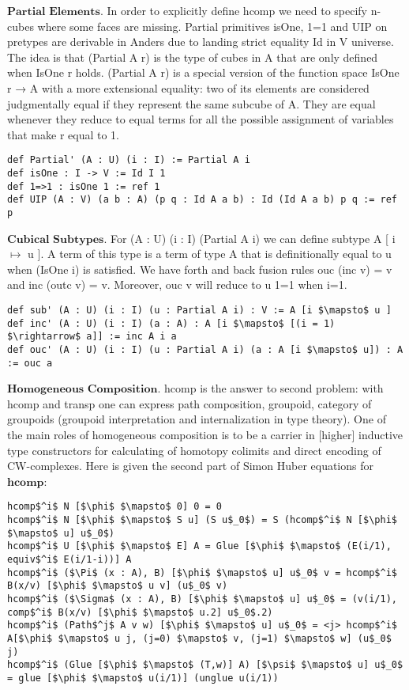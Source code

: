 \documentclass{article}
\theoremstyle{definition}
\begin{document}
\newpage
$\textbf{Partial\ Elements}$. In order to explicitly define hcomp we need to specify
n-cubes where some faces are missing. Partial primitives isOne, 1=1 and UIP on pretypes
are derivable in Anders due to landing strict equality Id in V universe. The idea is
that (Partial A r) is the type of cubes in A that are only defined when IsOne r holds.
(Partial A r) is a special version of the function space IsOne r → A with a more
extensional equality: two of its elements are considered judgmentally equal if
they represent the same subcube of A. They are equal whenever they reduce to
equal terms for all the possible assignment of variables that make r equal to 1.

\begin{lstlisting}[mathescape=true]
def Partial' (A : U) (i : I) := Partial A i
def isOne : I -> V := Id I 1
def 1=>1 : isOne 1 := ref 1
def UIP (A : V) (a b : A) (p q : Id A a b) : Id (Id A a b) p q := ref p
\end{lstlisting}

$\textbf{Cubical\ Subtypes}$. For (A : U) (i : I) (Partial A i) we can define
subtype A [ i $\mapsto$ u ]. A term of this type is a term of type A that is
definitionally equal to u when (IsOne i) is satisfied. We have forth and back
fusion rules ouc (inc v) = v and inc (outc v) = v. Moreover, ouc v will reduce to u 1=1 when i=1.

\begin{lstlisting}[mathescape=true]
def sub' (A : U) (i : I) (u : Partial A i) : V := A [i $\mapsto$ u ]
def inc' (A : U) (i : I) (a : A) : A [i $\mapsto$ [(i = 1) $\rightarrow$ a]] := inc A i a
def ouc' (A : U) (i : I) (u : Partial A i) (a : A [i $\mapsto$ u]) : A := ouc a
\end{lstlisting}

$\textbf{Homogeneous\ Composition}$. hcomp is the answer to second problem: with hcomp and transp
one can express path composition, groupoid, category of groupoids (groupoid interpretation and
internalization in type theory). One of the main roles of homogeneous composition is to be a
carrier in [higher] inductive type constructors for calculating of homotopy colimits and direct
encoding of CW-complexes. Here is given the second part of Simon Huber equations \cite{Huber} for $\textbf{hcomp}$:

\begin{lstlisting}[mathescape=true]
hcomp$^i$ N [$\phi$ $\mapsto$ 0] 0 = 0
hcomp$^i$ N [$\phi$ $\mapsto$ S u] (S u$_0$) = S (hcomp$^i$ N [$\phi$ $\mapsto$ u] u$_0$)
hcomp$^i$ U [$\phi$ $\mapsto$ E] A = Glue [$\phi$ $\mapsto$ (E(i/1), equiv$^i$ E(i/1-i))] A
hcomp$^i$ ($\Pi$ (x : A), B) [$\phi$ $\mapsto$ u] u$_0$ v = hcomp$^i$ B(x/v) [$\phi$ $\mapsto$ u v] (u$_0$ v)
hcomp$^i$ ($\Sigma$ (x : A), B) [$\phi$ $\mapsto$ u] u$_0$ = (v(i/1), comp$^i$ B(x/v) [$\phi$ $\mapsto$ u.2] u$_0$.2)
hcomp$^i$ (Path$^j$ A v w) [$\phi$ $\mapsto$ u] u$_0$ = <j> hcomp$^i$ A[$\phi$ $\mapsto$ u j, (j=0) $\mapsto$ v, (j=1) $\mapsto$ w] (u$_0$ j)
hcomp$^i$ (Glue [$\phi$ $\mapsto$ (T,w)] A) [$\psi$ $\mapsto$ u] u$_0$ = glue [$\phi$ $\mapsto$ u(i/1)] (unglue u(i/1))
\end{lstlisting}
\end{document}
